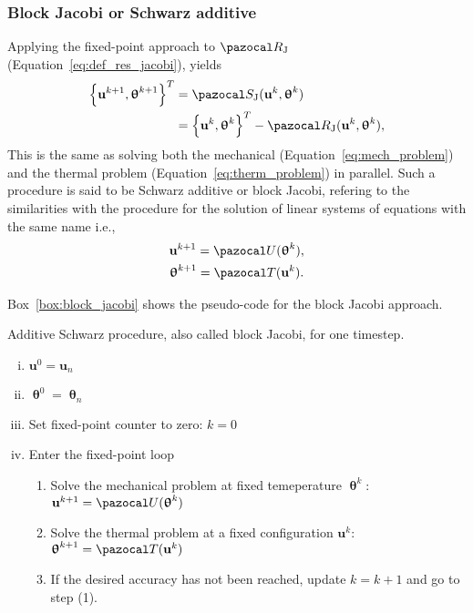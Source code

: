 \subsubsection{Block Jacobi or Schwarz additive}

Applying the fixed-point approach to \(\pazocal R_\mathrm{J}\) (Equation~\eqref{eq:def_res_jacobi}), yields
\begin{align}
  \left\{\mathbf u^{k+1}, \bm\uptheta^{k+1}\right\}^T &= \pazocal S_\mathrm{J}(\mathbf u^k, \bm\uptheta^k)\\
   &= \left\{\mathbf u^k, \bm\uptheta^k\right\}^T - \pazocal R_\mathrm{J}(\mathbf u^k, \bm \uptheta^k),
\end{align}
This is the same as solving both the mechanical (Equation~\eqref{eq:mech_problem}) and the thermal problem (Equation~\eqref{eq:therm_problem}) in parallel.
Such a procedure is said to be Schwarz additive or block Jacobi, refering to the similarities with the procedure for the solution of linear systems of equations with the same name i.e.,
\begin{gather}
\mathbf u^{k+1} = \pazocal U(\bm \uptheta^k),\\
\bm \uptheta^{k+1} = \pazocal T(\mathbf u^k).
\end{gather}

Box~\ref{box:block_jacobi} shows the pseudo-code for the block Jacobi approach.

\begin{framedbox}[htb]
  \caption{Additive Schwarz procedure, also called block Jacobi, for one timestep.}
  \label{box:block_jacobi}
  \begin{center}
    \begin{minipage}{0.9\textwidth}
    \begin{enumerate}[(i)]
    \item \(\mathbf u^0 = \mathbf u_{n}\)
    \item \(\bm \uptheta^0 = \bm \uptheta_n\)
    \item Set fixed-point counter to zero: \(k=0\)
    \item Enter the fixed-point loop
    \begin{enumerate}[(1)]
      \item Solve the mechanical problem at fixed temeperature \(\bm \uptheta^k\): \(\mathbf u^{k+1} = \pazocal U(\bm \uptheta^k)\)
      \item Solve the thermal problem at a fixed configuration \(\mathbf u^k\): \(\bm \uptheta^{k+1} = \pazocal T(\mathbf u^k)\)
      \item If the desired accuracy has not been reached, update \(k=k+1\) and go to step (1).

    \end{enumerate}
    \end{enumerate}
    \end{minipage}
  \end{center}
\end{framedbox}

